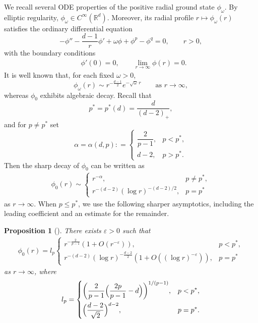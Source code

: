 \documentclass[12pt, a4paper, reqno]{amsart}
\numberwithin{equation}{section}
\newtheorem{proposition}[theorem]{Proposition}
\theoremstyle{definition}
\theoremstyle{remark}
\newcommand{\R}{\mathbb R}
\newcommand{\ce}{\mathrel{\mathop:}=}
\begin{document}
We recall several ODE properties of the positive radial ground state $\phi_\omega$. By elliptic regularity, $\phi_\omega\in C^\infty(\R^d)$. Moreover, its radial profile $r\mapsto\phi_\omega(r)$ satisfies the ordinary differential equation
\begin{equation*}
    -\phi''
    -\frac{d-1}{r}\phi'
    +\omega\phi
    +\phi^p
    -\phi^q
    =0,\qquad r>0,
\end{equation*}
with the boundary conditions
\begin{align*}
   &\phi'(0)=0,\qquad \lim_{r\to\infty}\phi(r)=0.
\end{align*}
It is well known that, for each fixed $\omega>0$,
\begin{equation}\label{eq:phi-exp}
  \phi_\omega(r)
  \sim r^{-\frac{d-1}{2}}e^{-\sqrt{\omega}\,r}
  \qquad\text{as }r\to\infty,
\end{equation}
whereas $\phi_0$ exhibits algebraic decay. 
Recall that 
\begin{equation*}
p^*=p^*(d)=\frac{d}{(d-2)_+},
\end{equation*}
and for $p\ne p^*$ set
\begin{equation}\label{eq:alpha}
  \alpha=\alpha(d,p)
  \ce \begin{cases}
    \dfrac{2}{p-1}, & p<p^*,\\[2pt]
    d-2, & p>p^*.
  \end{cases}
\end{equation}
Then the sharp decay of $\phi_0$ can be written as
\begin{align}
\label{eq:phidec}
 \phi_0(r)
    \sim\begin{cases}
      r^{-\alpha}, & p\ne p^*,\\[2pt]
      r^{-(d-2)}(\log r)^{-(d-2)/2}, & p=p^*
    \end{cases}
\end{align}
as $r\to\infty$.
When $p\le p^*$, we use the following sharper asymptotics, including the leading coefficient and an estimate for the remainder.

\begin{proposition}[{\cite{V81}}]
\label{prop:V}
There exists $\varepsilon>0$ such that
\begin{align}
\label{eq:sharp}
    \phi_0(r)=
    l_p\begin{cases}
    r^{-\frac{2}{p-1}}(1+O(r^{-\varepsilon})), & p<p^*,\\[2pt]
    r^{-(d-2)}(\log r)^{-\frac{d-2}{2}}(1+O((\log r)^{-\varepsilon})), & p=p^*
    \end{cases}
\end{align}
as $r\to\infty$, where
\[  l_p
    =\left\{\begin{alignedat}{2}
   &\biggl(\frac{2}{p-1}\Bigl(\frac{2p}{p-1}-d\Bigr)\biggr)^{1/(p-1)},&\quad
   &p<p^*,\\
   &\Bigl(\frac{d-2}{\sqrt{2}}\Bigr)^{d-2},&\quad
   &p=p^*.
    \end{alignedat}\right.
\]
\end{proposition}
\end{document}
